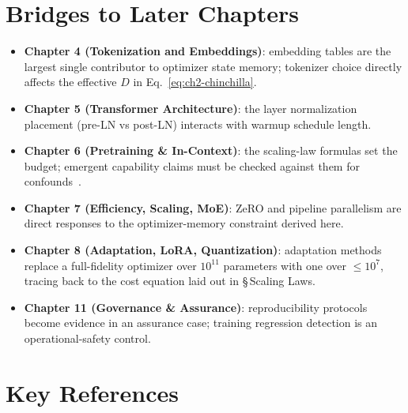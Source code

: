 \section{Bridges to Later Chapters}

\begin{itemize}
  \item \textbf{Chapter 4 (Tokenization and Embeddings)}: embedding tables
        are the largest single contributor to optimizer state memory;
        tokenizer choice directly affects the effective $D$ in
        Eq.~\eqref{eq:ch2-chinchilla}.
  \item \textbf{Chapter 5 (Transformer Architecture)}: the layer
        normalization placement (pre-LN vs post-LN)
        \citep{xiong2020onlayer} interacts with warmup schedule length.
  \item \textbf{Chapter 6 (Pretraining \& In-Context)}: the scaling-law
        formulas set the budget; emergent capability claims must be
        checked against them for confounds~\citep{schaeffer2023mirage}.
  \item \textbf{Chapter 7 (Efficiency, Scaling, MoE)}: ZeRO
        \citep{rajbhandari2020zero} and pipeline parallelism
        \citep{narayanan2021efficient} are direct responses to the
        optimizer-memory constraint derived here.
  \item \textbf{Chapter 8 (Adaptation, LoRA, Quantization)}: adaptation
        methods replace a full-fidelity optimizer over $10^{11}$
        parameters with one over $\le 10^{7}$, tracing back to the
        cost equation laid out in \S\,Scaling Laws.
  \item \textbf{Chapter 11 (Governance \& Assurance)}: reproducibility
        protocols become evidence in an assurance case; training
        regression detection is an operational-safety control.
\end{itemize}

\section{Key References}

